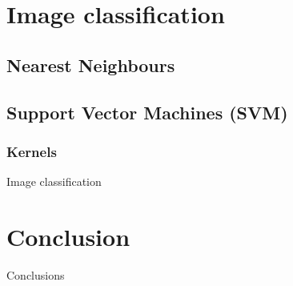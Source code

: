 \documentclass[10pt,twocolumn,letterpaper]{article}
\begin{document}
\section{Image classification}

\subsection{Nearest Neighbours}

\subsection{Support Vector Machines (SVM)}

\subsubsection{Kernels}




Image classification

\section{Conclusion}

Conclusions
\end{document}
